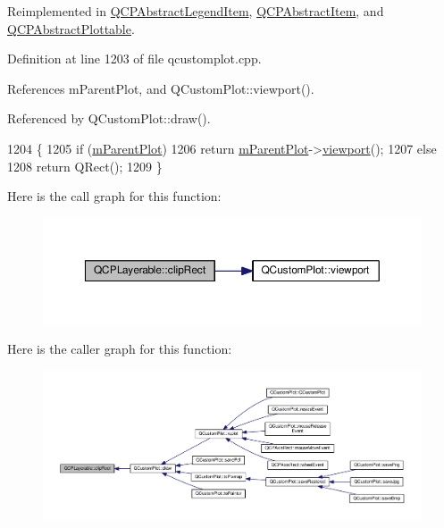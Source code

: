 Reimplemented in \hyperlink{class_q_c_p_abstract_legend_item_abcb540c331b49ef7ee0ea1abbd0dcac3}{Q\+C\+P\+Abstract\+Legend\+Item}, \hyperlink{class_q_c_p_abstract_item_a538e25ff8856534582f5b2b400a46405}{Q\+C\+P\+Abstract\+Item}, and \hyperlink{class_q_c_p_abstract_plottable_ac01960b0827913922f5364d559c124ed}{Q\+C\+P\+Abstract\+Plottable}.



Definition at line 1203 of file qcustomplot.\+cpp.



References m\+Parent\+Plot, and Q\+Custom\+Plot\+::viewport().



Referenced by Q\+Custom\+Plot\+::draw().


\begin{DoxyCode}
1204 \{
1205   \textcolor{keywordflow}{if} (\hyperlink{class_q_c_p_layerable_aa2a528433e44db02b8aef23c1f9f90ed}{mParentPlot})
1206     \textcolor{keywordflow}{return} \hyperlink{class_q_c_p_layerable_aa2a528433e44db02b8aef23c1f9f90ed}{mParentPlot}->\hyperlink{class_q_custom_plot_a953ecdbc28018e7e84cb6213ad3d88c2}{viewport}();
1207   \textcolor{keywordflow}{else}
1208     \textcolor{keywordflow}{return} QRect();
1209 \}
\end{DoxyCode}


Here is the call graph for this function\+:\nopagebreak
\begin{figure}[H]
\begin{center}
\leavevmode
\includegraphics[width=350pt]{class_q_c_p_layerable_a07a8f746640c3704b09910df297afcba_cgraph}
\end{center}
\end{figure}




Here is the caller graph for this function\+:\nopagebreak
\begin{figure}[H]
\begin{center}
\leavevmode
\includegraphics[width=350pt]{class_q_c_p_layerable_a07a8f746640c3704b09910df297afcba_icgraph}
\end{center}
\end{figure}


